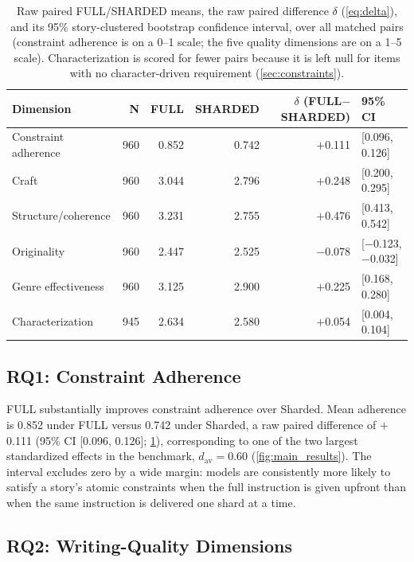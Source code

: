 \begin{table}[t]
\centering
\small
\begin{tabular}{lrrrrl}
\toprule
\textbf{Dimension} & \textbf{N} & \textbf{FULL} & \textbf{SHARDED} & \textbf{$\delta$ (FULL$-$SHARDED)} & \textbf{95\% CI} \\
\midrule
Constraint adherence & 960 & 0.852 & 0.742 & $+$0.111 & [0.096, 0.126] \\
Craft                & 960 & 3.044 & 2.796 & $+$0.248 & [0.200, 0.295] \\
Structure/coherence  & 960 & 3.231 & 2.755 & $+$0.476 & [0.413, 0.542] \\
Originality          & 960 & 2.447 & 2.525 & $-$0.078 & [$-$0.123, $-$0.032] \\
Genre effectiveness  & 960 & 3.125 & 2.900 & $+$0.225 & [0.168, 0.280] \\
Characterization      & 945 & 2.634 & 2.580 & $+$0.054 & [0.004, 0.104] \\
\bottomrule
\end{tabular}
\caption{Raw paired FULL/SHARDED means, the raw paired difference $\delta$ (\cref{eq:delta}), and its 95\% story-clustered bootstrap confidence interval, over all matched pairs (constraint adherence is on a 0--1 scale; the five quality dimensions are on a 1--5 scale). Characterization is scored for fewer pairs because it is left null for items with no character-driven requirement (\cref{sec:constraints}).}
\label{tab:main_results}
\end{table}

\subsection{RQ1: Constraint Adherence}
\label{sec:rq1}

FULL substantially improves constraint adherence over Sharded. Mean adherence is 0.852 under FULL versus 0.742 under Sharded, a raw paired difference of $+$0.111 (95\% CI [0.096, 0.126]; \cref{tab:main_results}), corresponding to one of the two largest standardized effects in the benchmark, $d_{\mathrm{av}} = 0.60$ (\cref{fig:main_results}). The interval excludes zero by a wide margin: models are consistently more likely to satisfy a story's atomic constraints when the full instruction is given upfront than when the same instruction is delivered one shard at a time.

\subsection{RQ2: Writing-Quality Dimensions}
\label{sec:rq2}

